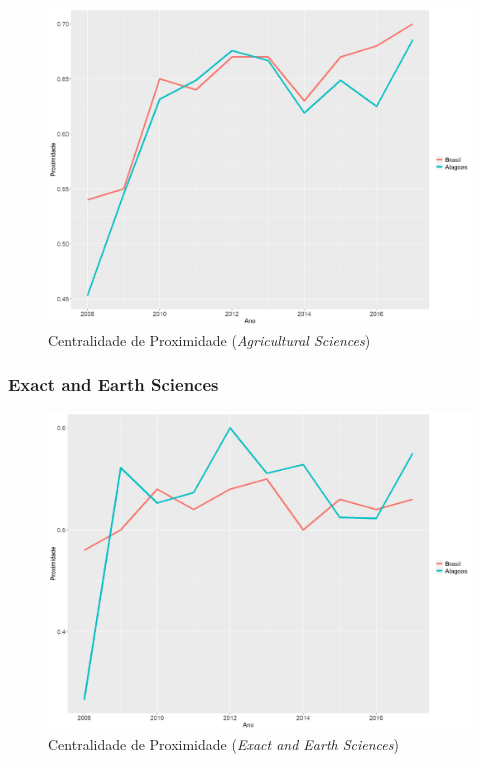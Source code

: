 \begin{figure}[H]
	\centering
	\includegraphics[scale=0.4]{Imagens/agricultural/graf-linha-closeness-br-al.pdf}
	\caption{Centralidade de Proximidade (\textit{Agricultural Sciences})}
	\label{close-agri}
\end{figure}

\subsubsection{Exact and Earth Sciences}

\begin{figure}[H]
	\centering
	\includegraphics[scale=0.4]{Imagens/exact/graf-linha-closeness-br-al.pdf}
	\caption{Centralidade de Proximidade (\textit{Exact and Earth Sciences})}
	\label{close-exact}
\end{figure}

